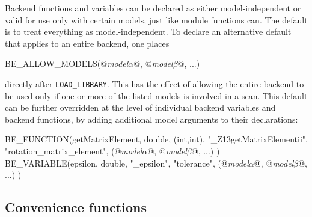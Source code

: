 \documentclass[pdftex,twocolumn,epjc3_preprint,runningheads]{svjour3}
\renewcommand{\_}{\discretionary{\underscore}{}{\underscore}}
\newcommand\cpp[1]{{\lstinline!#1!}}  %
\newcommand{\metavarf}[1]{\textit{\color{darkgreen}\footnotesize\textrm{#1}}}
\newcommand{\metavar}{\metavarf}
\begin{document}
Backend functions and variables can be declared as either model-independent or valid for use only with certain models, just like module functions can.  The default is to treat everything as model-independent.  To declare an alternative default that applies to an entire backend, one places
\begin{lstcpp}
BE_ALLOW_MODELS(@\metavar{model\_$\alpha$}@, @\metavar{model\_$\beta$}@, ...)
\end{lstcpp}
directly after \cpp{LOAD_LIBRARY}.  This has the effect of allowing the entire backend to be used only if one or more of the listed models is involved in a scan.  This default can be further overridden at the level of individual backend variables and backend functions, by adding additional model arguments to their declarations:
\begin{lstcpp}
BE_FUNCTION(getMatrixElement, double, (int,int),
            "_Z13getMatrixElementii",
            "rotation_matrix_element",
            (@\metavar{model\_$\alpha$}@, @\metavar{model\_$\beta$}@, ...) )
BE_VARIABLE(epsilon, double,
            "_epsilon",
            "tolerance",
            (@\metavar{model\_$\alpha$}@, @\metavar{model\_$\beta$}@, ...) )
\end{lstcpp}

\subsection{Convenience functions}
\label{be_conv_func}
\end{document}
